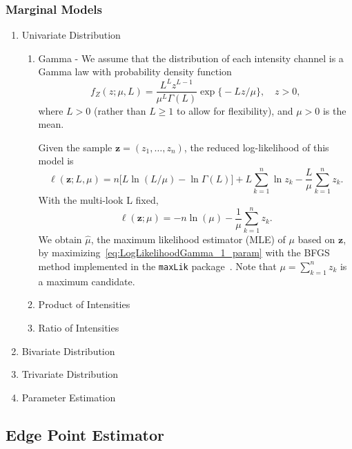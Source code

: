 \documentclass[remotesensing,article,submit,moreauthors,pdftex]{Definitions/mdpi}
\begin{document}
\subsubsection{Marginal Models}
\begin{enumerate}[leftmargin=*,labelsep=4.9mm]
	\item Univariate Distribution
		\begin{enumerate}[leftmargin=*,labelsep=4.9mm]
		\item	Gamma -  
			We assume that the distribution of each intensity channel is a 
			Gamma law with probability density function
			\begin{equation}
			f_Z(z;\mu,L)=\frac{L^{L}z^{L-1}}{\mu^{L}\Gamma(L)} \exp\big\{-Lz/\mu\big\},\quad z>0,
			\label{func_dens_uni_gamma}
			\end{equation}
			where $L>0$ (rather than $L\geq1$ to allow for flexibility), and $\mu>0$ is the mean.

			Given the sample $\bm z = (z_1,\dots,z_n)$, the reduced log-likelihood of this model is
			\begin{equation}
			\ell(\bm z; L,\mu) = n \big[L\ln (L / \mu) - \ln \Gamma(L)\big]+L \sum_{k=1}^{n}\ln z_k -\frac{L}{\mu}\sum_{k=1}^{n}z_k.
			\label{eq:LogLikelihoodGamma_2_param}
			\end{equation}
			With the multi-look L fixed, 	
			\begin{equation}
			\ell(\bm z; \mu) = -n\ln (\mu) - \frac{1}{\mu}\sum_{k=1}^{n}z_k.
			\label{eq:LogLikelihoodGamma_1_param}
			\end{equation}
			We obtain $\widehat \mu$, the maximum likelihood estimator (MLE) of $\mu$ based on $\bm z$, by 					maximizing~\eqref{eq:LogLikelihoodGamma_1_param} with the BFGS method implemented in the \texttt{maxLik} package~\cite{ht}. Note that $\mu=\sum_{k=1}^{n}z_k$ is a maximum candidate.  
		\item	Product of Intensities
		\item	Ratio of Intensities
		\end{enumerate}
	\item Bivariate Distribution
	\item Trivariate Distribution
	\item Parameter Estimation
\end{enumerate}
\subsection{Edge Point Estimator}
\end{document}
